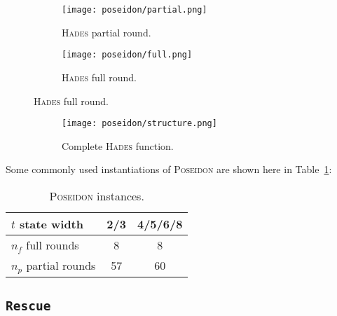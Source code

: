 \documentclass[12pt, a4paper]{report}
\begin{document}
\begin{figure}[H]
  \begin{center}
    \begin{subfigure}{0.40\textwidth}
      \texttt{[image: poseidon/partial.png]}
      \caption{\textsc{Hades} partial round.}\label{subfig:poseidonpartial}
    \end{subfigure}
    \hfill
    \begin{subfigure}{0.40\textwidth}
      \texttt{[image: poseidon/full.png]}
      \caption{\textsc{Hades} full round.}\label{subfig:poseidonfull}
    \end{subfigure}
  \end{center}
\end{figure}
\renewcommand\thesubfigure{c}
\begin{figure}[H]
  \begin{center}
    \begin{subfigure}{0.40\textwidth}
      \texttt{[image: poseidon/structure.png]}
      \caption{Complete \textsc{Hades} function.}\label{subfig:poseidonstructure}
    \end{subfigure}
  \end{center}
  \caption{}\label{fig:poseidon}
\end{figure}

Some commonly used instantiations of \textsc{Poseidon} are shown here in Table~\ref{tab:poseidoninstances}:
\begin{table}[H]
  \begin{center}
    \begin{tabular}{|l|c|c|}
      \hline
      $t$ state width & 2/3 & 4/5/6/8 \\
      \hline
      $n_f$ full rounds & 8 & 8 \\
      \hline
      $n_p$ partial rounds & 57 & 60 \\
      \hline
    \end{tabular}
  \end{center}
  \caption{\textsc{Poseidon} instances.}\label{tab:poseidoninstances}
\end{table}

\subsection{\texttt{Rescue}}\label{subsec:rescue}
\end{document}
